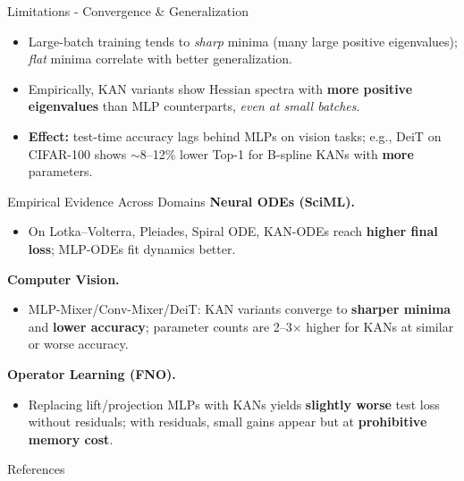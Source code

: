 \documentclass[aspectratio=169]{beamer}
\begin{document}
\begin{frame}{Limitations - Convergence \& Generalization}
	\begin{itemize}
		\item Large-batch training tends to \emph{sharp} minima (many large positive eigenvalues); \emph{flat} minima correlate with better generalization.
		\item Empirically, KAN variants show Hessian spectra with \textbf{more positive eigenvalues} than MLP counterparts, \emph{even at small batches}.
		\item \textbf{Effect:} test-time accuracy lags behind MLPs on vision tasks; e.g., DeiT on CIFAR-100 shows $\sim$8--12\% lower Top-1 for B-spline KANs with \textbf{more} parameters.
	\end{itemize}
\end{frame}


\begin{frame}{Empirical Evidence Across Domains}
	\textbf{Neural ODEs (SciML).}
	\begin{itemize}
		\item On Lotka–Volterra, Pleiades, Spiral ODE, KAN-ODEs reach \textbf{higher final loss}; MLP-ODEs fit dynamics better.
	\end{itemize}
	
	\textbf{Computer Vision.}
	\begin{itemize}
		\item MLP-Mixer/Conv-Mixer/DeiT: KAN variants converge to \textbf{sharper minima} and \textbf{lower accuracy}; parameter counts are 2--3$\times$ higher for KANs at similar or worse accuracy.
	\end{itemize}
	
	\textbf{Operator Learning (FNO).}
	\begin{itemize}
		\item Replacing lift/projection MLPs with KANs yields \textbf{slightly worse} test loss without residuals; with residuals, small gains appear but at \textbf{prohibitive memory cost}.
	\end{itemize}
\end{frame}


\begin{frame}{References}
	\nocite{liu_kan_2025}
	\nocite{pal_understanding_nodate}
	\printbibliography[heading=none]
\end{frame}
\end{document}
